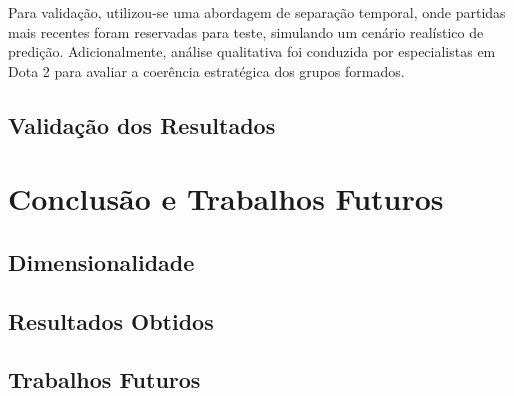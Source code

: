 \documentclass[12pt]{article}
\begin{document}
Para validação, utilizou-se uma abordagem de separação temporal, onde partidas mais recentes foram reservadas para teste, simulando um cenário realístico de predição. Adicionalmente, análise qualitativa foi conduzida por especialistas em Dota 2 para avaliar a coerência estratégica dos grupos formados.

\subsection{Validação dos Resultados}

\section{Conclusão e Trabalhos Futuros}

\subsection{Dimensionalidade}

\subsection{Resultados Obtidos}

\subsection{Trabalhos Futuros}








\end{document}
